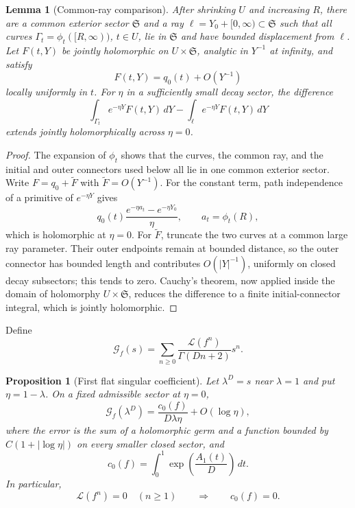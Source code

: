 \documentclass[11pt]{article}
\numberwithin{equation}{section}
\newtheorem{proposition}[proposition]{Proposition}
\newtheorem{lemma}[lemma]{Lemma}
\theoremstyle{definition}
\theoremstyle{remark}
\newcommand{\Lfac}{\mathcal L}
\newcommand{\Gcal}{\mathcal G}
\begin{document}
\begin{lemma}[Common-ray comparison]\label{lem:flat-common-ray}
After shrinking $U$ and increasing $R$, there are a common exterior sector
$\mathfrak S$ and a ray $\ell=Y_0+[0,\infty)\subset\mathfrak S$ such that
all curves $\Gamma_t=\phi_t([R,\infty))$, $t\in U$, lie in $\mathfrak S$
and have bounded displacement from $\ell$.  Let $F(t,Y)$ be jointly
holomorphic on $U\times\mathfrak S$, analytic in $Y^{-1}$ at infinity, and
satisfy
\[
  F(t,Y)=q_0(t)+O(Y^{-1})
\]
locally uniformly in $t$.  For $\eta$ in a sufficiently small decay sector,
the difference
\[
  \int_{\Gamma_t}e^{-\eta Y}F(t,Y)\,dY
  -\int_\ell e^{-\eta Y}F(t,Y)\,dY
\]
extends jointly holomorphically across $\eta=0$.
\end{lemma}

\begin{proof}
The expansion of $\phi_t$ shows that the curves, the common ray, and the
initial and outer connectors used below all lie in one common exterior
sector.  Write $F=q_0+\widetilde F$ with
$\widetilde F=O(Y^{-1})$.  For the constant term, path independence of a
primitive of $e^{-\eta Y}$ gives
\[
  q_0(t)\frac{e^{-\eta a_t}-e^{-\eta Y_0}}{\eta},
  \qquad a_t=\phi_t(R),
\]
which is holomorphic at $\eta=0$.  For $\widetilde F$, truncate the two
curves at a common large ray parameter.  Their outer endpoints remain at
bounded distance, so the outer connector has bounded length and contributes
$O(|Y|^{-1})$, uniformly on closed decay subsectors; this tends to zero.
Cauchy's theorem, now applied inside the domain of holomorphy
$U\times\mathfrak S$, reduces the difference to a finite initial-connector
integral, which is jointly holomorphic.
\end{proof}

Define
\begin{equation}\label{eq:flat-generating}
  \Gcal_f(s)=\sum_{n\ge0}
  \frac{\Lfac(f^n)}{\Gamma(Dn+2)}s^n.
\end{equation}

\begin{proposition}[First flat singular coefficient]\label{prop:first-flat-symbol}
Let $\lambda^D=s$ near $\lambda=1$ and put $\eta=1-\lambda$.  On a fixed
admissible sector at $\eta=0$,
\begin{equation}\label{eq:first-flat-symbol}
  \Gcal_f(\lambda^D)
  =\frac{c_0(f)}{D\lambda\eta}+O(\log\eta),
\end{equation}
where the error is the sum of a holomorphic germ and a function bounded by
$C(1+|\log\eta|)$ on every smaller closed sector, and
\begin{equation}\label{eq:flat-c0}
  c_0(f)=\int_0^1
  \exp\!\left(\frac{A_1(t)}D\right)\,dt.
\end{equation}
In particular,
\begin{equation}\label{eq:moments-imply-c0}
  \Lfac(f^n)=0\quad(n\ge1)
  \qquad\Longrightarrow\qquad c_0(f)=0.
\end{equation}
\end{proposition}
\end{document}
